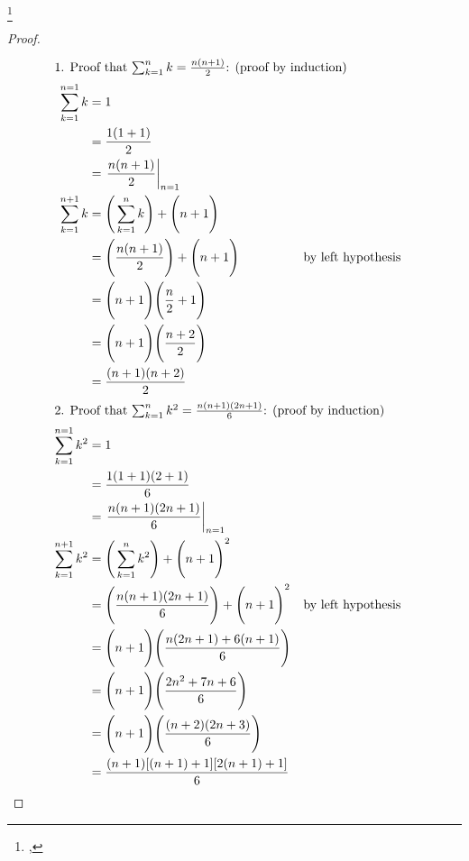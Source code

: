 \begin{proposition}
\footnote{
  ,
  }
\label{prop:powersums}
\end{proposition}
\begin{proof}
\begin{align*}
\intertext{1. Proof that $\sum_{k=1}^n k=\frac{n(n+1)}{2}$: (proof by induction)}
  \sum_{k=1}^{n=1} k
    &= 1
  \\&= \frac{1(1+1)}{2}
  \\&= \left.\frac{n(n+1)}{2}\right|_{n=1}
  \\
  \sum_{k=1}^{n+1} k
    &= \Bigg(\sum_{k=1}^n k\Bigg) + \Bigg(n+1\Bigg)
  \\&= \Bigg(\frac{n(n+1)}{2}\Bigg) + \Bigg(n+1\Bigg)
    && \text{by left hypothesis}
  \\&= \Bigg(n+1\Bigg)\Bigg(\frac{n}{2}+1\Bigg)
  \\&= \Bigg(n+1\Bigg)\Bigg(\frac{n+2}{2}\Bigg)
  \\&= \frac{(n+1)(n+2)}{2}
  \\
\intertext{2. Proof that $\sum_{k=1}^n k^2 = \frac{n(n+1)(2n+1)}{6}$: (proof by induction)}
  \sum_{k=1}^{n=1} k^2
    &= 1
  \\&= \frac{1(1+1)(2+1)}{6}
  \\&= \left.\frac{n(n+1)(2n+1)}{6}\right|_{n=1}
  \\
  \sum_{k=1}^{n+1} k^2
    &= \Bigg(\sum_{k=1}^n k^2\Bigg) + \Bigg(n+1\Bigg)^2
  \\&= \Bigg(\frac{n(n+1)(2n+1)}{6}\Bigg) + \Bigg(n+1\Bigg)^2
    && \text{by left hypothesis}
  \\&= \Bigg(n+1\Bigg)\Bigg(\frac{n(2n+1)+6(n+1)}{6}\Bigg)
  \\&= \Bigg(n+1\Bigg)\Bigg(\frac{2n^2+7n+6}{6}\Bigg)
  \\&= \Bigg(n+1\Bigg)\Bigg(\frac{(n+2)(2n+3)}{6}\Bigg)
  \\&= \frac{(n+1)[(n+1)+1][2(n+1)+1]}{6}
\end{align*}
\end{proof}


